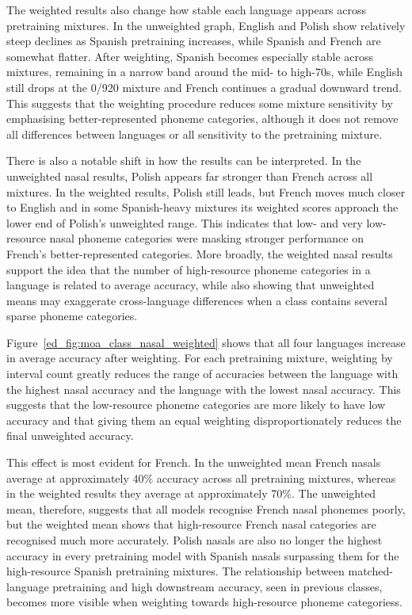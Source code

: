 The weighted results also change how stable each language appears across pretraining mixtures. In the unweighted graph, English and Polish show relatively steep declines as Spanish pretraining increases, while Spanish and French are somewhat flatter. After weighting, Spanish becomes especially stable across mixtures, remaining in a narrow band around the mid- to high-70s, while English still drops at the 0/920 mixture and French continues a gradual downward trend. This suggests that the weighting procedure reduces some mixture sensitivity by emphasising better-represented phoneme categories, although it does not remove all differences between languages or all sensitivity to the pretraining mixture.

There is also a notable shift in how the results can be interpreted. In the unweighted nasal results, Polish appears far stronger than French across all mixtures. In the weighted results, Polish still leads, but French moves much closer to English and in some Spanish-heavy mixtures its weighted scores approach the lower end of Polish’s unweighted range. This indicates that low- and very low-resource nasal phoneme categories were masking stronger performance on French’s better-represented categories. More broadly, the weighted nasal results support the idea that the number of high-resource phoneme categories in a language is related to average accuracy, while also showing that unweighted means may exaggerate cross-language differences when a class contains several sparse phoneme categories.
\fi



Figure~\ref{ed_fig:moa_class_nasal_weighted} shows that all four languages increase in average accuracy after weighting. For each pretraining mixture, weighting by interval count greatly reduces the range of accuracies between the language with the highest nasal accuracy and the language with the lowest nasal accuracy. This suggests that the low-resource phoneme categories are more likely to have low accuracy and that giving them an equal weighting disproportionately reduces the final unweighted accuracy. 

This effect is most evident for French. In the unweighted mean French nasals average at approximately 40\% accuracy across all pretraining mixtures, whereas in the weighted results they average at approximately 70\%. The unweighted mean, therefore, suggests that all models recognise French nasal phonemes poorly, but the weighted mean shows that high-resource French nasal categories are recognised much more accurately. Polish nasals are also no longer the highest accuracy in every pretraining model with Spanish nasals surpassing them for the high-resource Spanish pretraining mixtures. The relationship between matched-language pretraining and high downstream accuracy, seen in previous classes, becomes more visible when weighting towards high-resource phoneme categoriess. 

